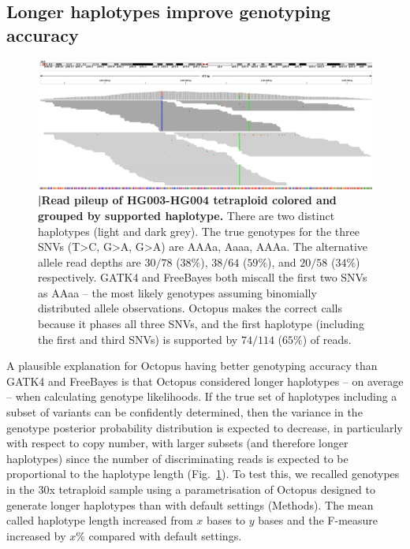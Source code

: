 \documentclass[notitlepage, twocolumn, 10pt]{article}
\begin{document}
\subsection*{Longer haplotypes improve genotyping accuracy}

\begin{figure}[tp]
	\centering
    \includegraphics[width=\textwidth,height=0.4\textwidth]{figures/tetraploid_haplotypes.png}
    \caption{\textbf{|\:Read pileup of HG003-HG004 tetraploid colored and grouped by supported haplotype.} There are two distinct haplotypes (light and dark grey). The true genotypes for the three SNVs (T>C, G>A, G>A) are AAAa, Aaaa, AAAa. The alternative allele read depths are $30/78$ ($38\%$), $38/64$ ($59\%$), and $20/58$ ($34\%$) respectively. GATK4 and FreeBayes both miscall the first two SNVs as AAaa -- the most likely genotypes assuming binomially distributed allele observations. Octopus makes the correct calls because it phases all three SNVs, and the first haplotype (including the first and third SNVs) is supported by $74/114$ ($65\%$) of reads.}
    \label{fig:tetraploid_haplotypes}
\end{figure}

A plausible explanation for Octopus having better genotyping accuracy than GATK4 and FreeBayes is that Octopus considered longer haplotypes -- on average -- when calculating genotype likelihoods. If the true set of haplotypes including a subset of variants can be confidently determined, then the variance in the genotype posterior probability distribution is expected to decrease, in particularly with respect to copy number, with larger subsets (and therefore longer haplotypes) since the number of discriminating reads is expected to be proportional to the haplotype length (Fig.\ \ref{fig:tetraploid_haplotypes}). To test this, we recalled genotypes in the $30$x tetraploid sample using a parametrisation of Octopus designed to generate longer haplotypes than with default settings (Methods). The mean called haplotype length increased from $x$ bases to $y$ bases and the F-measure increased by $x\%$ compared with default settings.
\end{document}
